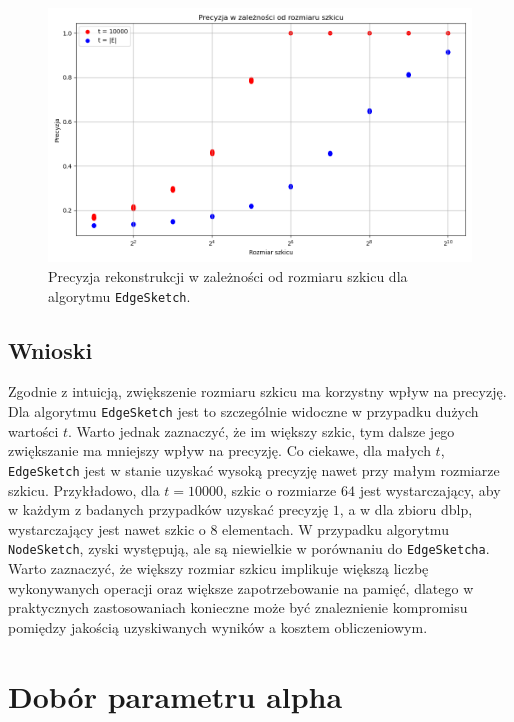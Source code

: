     \begin{figure}[!ht]
        \includegraphics[width=16cm]{img/precision_m.png}
        \centering
        \caption[Precyzja rekonstrukcji]{Precyzja rekonstrukcji w zależności od rozmiaru szkicu dla algorytmu \texttt{EdgeSketch}.}
        \label{fig:precision_m}
    \end{figure}
    
    \subsection{Wnioski}
    Zgodnie z intuicją, zwiększenie rozmiaru szkicu ma korzystny wpływ na precyzję. Dla algorytmu \texttt{EdgeSketch} jest to szczególnie widoczne w przypadku dużych wartości $t$. Warto jednak zaznaczyć, że im większy szkic, tym dalsze jego zwiększanie ma mniejszy wpływ na precyzję. Co ciekawe, dla małych $t$, \texttt{EdgeSketch} jest w stanie uzyskać wysoką precyzję nawet przy małym rozmiarze szkicu. Przykładowo, dla $t = 10000$, szkic o rozmiarze $64$ jest wystarczający, aby w każdym z badanych przypadków uzyskać precyzję $1$, a w dla zbioru dblp, wystarczający jest nawet szkic o $8$ elementach. W przypadku algorytmu \texttt{NodeSketch}, zyski występują, ale są niewielkie w porównaniu do \texttt{EdgeSketcha}. Warto zaznaczyć, że większy rozmiar szkicu implikuje większą liczbę wykonywanych operacji oraz większe zapotrzebowanie na pamięć, dlatego w praktycznych zastosowaniach konieczne może być znaleznienie kompromisu pomiędzy jakością uzyskiwanych wyników a kosztem obliczeniowym.

\section{Dobór parametru alpha}


